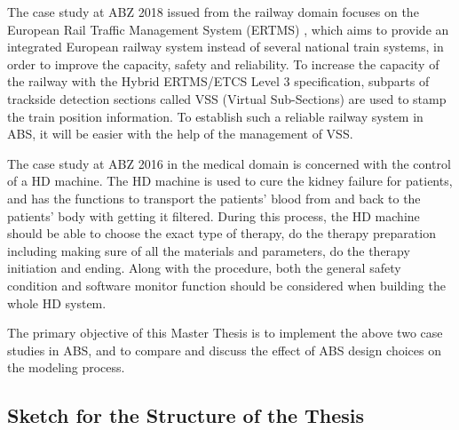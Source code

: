 \documentclass[article,dr=phil,type=msc,colorback,accentcolor=tud9c]{tudthesis}
\begin{document}
  The case study at ABZ 2018 issued from the railway domain focuses on the European Rail Traffic Management System (ERTMS) \cite{hybridl3}, which aims to provide an integrated European railway system instead of several national train systems, in order to improve the capacity, safety and reliability. To increase the capacity of the railway with the Hybrid ERTMS/ETCS Level 3 specification, subparts of trackside detection sections called VSS (Virtual Sub-Sections) are used to stamp the train position information. To establish such a reliable railway system in ABS, it will be easier with the help of the management of VSS.\cite{hoang2018hybrid}
  
  The case study at ABZ 2016 in the medical domain is concerned with the control of a HD machine. The HD machine is used to cure the kidney failure for patients, and has the functions to transport the patients' blood from and back to the patients' body with getting it filtered. During this process, the HD machine should be able to choose the exact type of therapy, do the therapy preparation including making sure of all the materials and parameters, do the therapy initiation and ending. Along with the procedure, both the general safety condition and software monitor function should be considered when building the whole HD system. 
  
  The primary objective of this Master Thesis is to implement the above two case studies in ABS, and to compare and discuss the effect of ABS design choices on the modeling process.
  
  \subsection{Sketch for the Structure of the Thesis}
\end{document}
